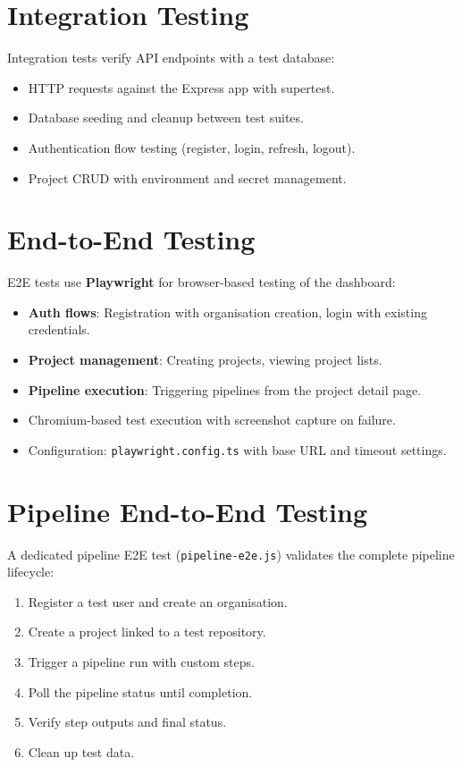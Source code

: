 \documentclass[12pt,a4paper,twoside]{report}
\begin{document}
\section{Integration Testing}

Integration tests verify API endpoints with a test database:

\begin{itemize}[noitemsep]
  \item HTTP requests against the Express app with supertest.
  \item Database seeding and cleanup between test suites.
  \item Authentication flow testing (register, login, refresh, logout).
  \item Project CRUD with environment and secret management.
\end{itemize}

\section{End-to-End Testing}

E2E tests use \textbf{Playwright} for browser-based testing of the dashboard:

\begin{itemize}[noitemsep]
  \item \textbf{Auth flows}: Registration with organisation creation, login with existing credentials.
  \item \textbf{Project management}: Creating projects, viewing project lists.
  \item \textbf{Pipeline execution}: Triggering pipelines from the project detail page.
  \item Chromium-based test execution with screenshot capture on failure.
  \item Configuration: \texttt{playwright.config.ts} with base URL and timeout settings.
\end{itemize}

\section{Pipeline End-to-End Testing}

A dedicated pipeline E2E test (\texttt{pipeline-e2e.js}) validates the complete pipeline lifecycle:

\begin{enumerate}[noitemsep]
  \item Register a test user and create an organisation.
  \item Create a project linked to a test repository.
  \item Trigger a pipeline run with custom steps.
  \item Poll the pipeline status until completion.
  \item Verify step outputs and final status.
  \item Clean up test data.
\end{enumerate}
\end{document}
